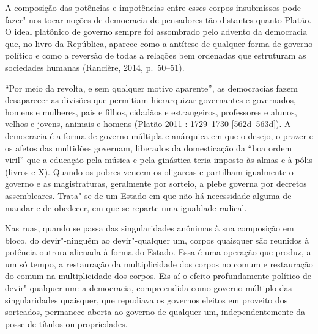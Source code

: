 A composição das potências e impotências entre esses corpos insubmissos
pode fazer"-nos tocar noções de democracia de pensadores tão distantes
quanto Platão. O ideal platônico de governo sempre foi assombrado pelo
advento da democracia que, no livro  da República, aparece como a
antítese de qualquer forma de governo político e como a reversão de
todas a relações bem ordenadas que estruturam as sociedades humanas
(Rancière, 2014, p.~50--51).

``Por meio da revolta, e sem qualquer motivo aparente'', as democracias
fazem desaparecer as divisões que permitiam hierarquizar governantes e
governados, homens e mulheres, pais e filhos, cidadãos e estrangeiros,
professores e alunos, velhos e jovens, animais e homens (Platão 2011 :
1729--1730 {[}562d--563d{]}). A democracia é a forma de governo múltipla e
anárquica em que o desejo, o prazer e os afetos das multidões governam,
liberados da domesticação da ``boa ordem viril'' que a educação pela
música e pela ginástica teria imposto às almas e à pólis (livros  e
X). Quando os pobres vencem os oligarcas e partilham igualmente o
governo e as magistraturas, geralmente por sorteio, a plebe governa por
decretos assembleares. Trata"-se de um Estado em que não há necessidade
alguma de mandar e de obedecer, em que se reparte uma igualdade radical.

Nas ruas, quando se passa das singularidades anônimas à sua composição
em bloco, do devir"-ninguém ao devir"-qualquer um, corpos quaisquer são
reunidos à potência outrora alienada à forma do Estado. Essa é uma
operação que produz, a um só tempo, a restauração da multiplicidade dos
corpos no comum e restauração do comum na multiplicidade dos corpos. Eis
aí o efeito profundamente político de devir"-qualquer um: a democracia,
compreendida como governo múltiplo das singularidades quaisquer, que
repudiava os governos eleitos em proveito dos sorteados, permanece
aberta ao governo de qualquer um, independentemente da posse de títulos
ou propriedades.

